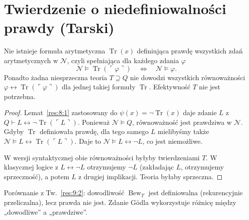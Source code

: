 \section{Twierdzenie o niedefiniowalności prawdy (Tarski)}\label{sec:tarski}
\begin{twierdzenie}\label{res:10:1}
Nie istnieje formuła arytmetyczna $\operatorname{Tr}(x)$ definiująca prawdę wszystkich zdań arytmetycznych w $\mathcal N$, czyli spełniająca dla każdego zdania $\varphi$
\[
\mathcal N\models\operatorname{Tr}(\ulcorner\varphi\urcorner)\quad\Longleftrightarrow\quad\mathcal N\models\varphi.
\]
Ponadto żadna niesprzeczna teoria $T\supseteq Q$ nie dowodzi wszystkich równoważności $\varphi\leftrightarrow\operatorname{Tr}(\ulcorner\varphi\urcorner)$ dla jednej takiej formuły $\operatorname{Tr}$. Efektywność $T$ nie jest potrzebna.
\end{twierdzenie}
\begin{proof}
Lemat~\ref{res:8:1} zastosowany do $\psi(x)=\neg\operatorname{Tr}(x)$ daje zdanie $L$ z $Q\vdash L\leftrightarrow\neg\operatorname{Tr}(\ulcorner L\urcorner)$. Ponieważ $\mathcal N\models Q$, równoważność jest prawdziwa w $\mathcal N$. Gdyby $\operatorname{Tr}$ definiowała prawdę, dla tego samego $L$ mielibyśmy także $\mathcal N\models L\leftrightarrow\operatorname{Tr}(\ulcorner L\urcorner)$. Daje to $\mathcal N\models L\leftrightarrow\neg L$, co jest niemożliwe.

W wersji syntaktycznej obie równoważności byłyby twierdzeniami $T$. W klasycznej logice z $L\leftrightarrow\neg L$ otrzymujemy $\neg L$ (zakładając $L$, otrzymujemy sprzeczność), a potem $L$ z drugiej implikacji. Teoria byłaby sprzeczna.
\end{proof}

\begin{uwaga}\label{res:10:2}
Porównanie z Tw.~\ref{res:9:2}: dowodliwość $\operatorname{Bew}_T$ jest definiowalna (rekurencyjnie przeliczalna), lecz prawda nie jest. Zdanie Gödla wykorzystuje różnicę między „dowodliwe” a „prawdziwe”.
\end{uwaga}

